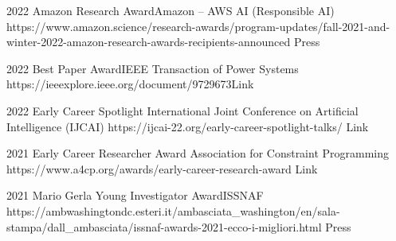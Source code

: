 \begin{awards}
	\awardentry
	{2022}
	{Amazon Research Award}{Amazon -- AWS AI (Responsible AI)}
	{https://www.amazon.science/research-awards/program-updates/fall-2021-and-winter-2022-amazon-research-awards-recipients-announced}
	{Press}

	\awardentry
	{2022}
	{Best Paper Award}{IEEE Transaction of Power Systems}
	{https://ieeexplore.ieee.org/document/9729673}{Link}

	\awardentry
	{2022}
	{Early Career Spotlight}%
	{International Joint Conference on Artificial Intelligence (IJCAI)}
	{https://ijcai-22.org/early-career-spotlight-talks/}
	{Link}

	\awardentry
	{2021}
	{Early Career Researcher Award}
	{Association for Constraint Programming}
	{https://www.a4cp.org/awards/early-career-research-award}
	{Link}

	\awardentry
	{2021}
	{Mario Gerla Young Investigator Award}{ISSNAF}
	{https://ambwashingtondc.esteri.it/ambasciata_washington/en/sala-stampa/dall_ambasciata/issnaf-awards-2021-ecco-i-migliori.html}
	{Press}


\end{awards}
